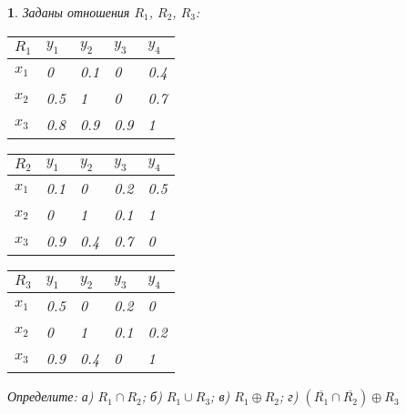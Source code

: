 \documentclass[11pt,a4paper,oneside]{article}
\newenvironment{problem}{
	\medskip
	\begin{problem-internal}
	}{
	\end{problem-internal}
}
\newtheorem{problem-internal}{}
\begin{document}
	\begin{problem}
		Заданы отношения $R_1$, $R_2$, $R_3$: 
		\begin{table}[!hbtp]
			\begin{tabular}{|l|l|l|l|l|}
				\hline
				$R_1$ & $y_1$ & $y_2$ & $y_3$ & $y_4$ \\ \hline
				$x_1$ & 0     & 0.1   & 0     & 0.4   \\ \hline
				$x_2$ & 0.5   & 1     & 0     & 0.7   \\ \hline
				$x_3$ & 0.8   & 0.9   & 0.9   & 1     \\ \hline
			\end{tabular}
		\end{table}
		\begin{table}[!hbtp]
			\begin{tabular}{|l|l|l|l|l|}
				\hline
				$R_2$ & $y_1$ & $y_2$ & $y_3$ & $y_4$ \\ \hline
				$x_1$ & 0.1     & 0   & 0.2     & 0.5   \\ \hline
				$x_2$ & 0   & 1     & 0.1     & 1   \\ \hline
				$x_3$ & 0.9   & 0.4   & 0.7   & 0     \\ \hline
			\end{tabular}
		\end{table}
		\begin{table}[!hbtp]
			\begin{tabular}{|l|l|l|l|l|}
				\hline
				$R_3$ & $y_1$ & $y_2$ & $y_3$ & $y_4$ \\ \hline
				$x_1$ & 0.5     & 0   & 0.2     & 0   \\ \hline
				$x_2$ & 0   & 1     & 0.1     & 0.2   \\ \hline
				$x_3$ & 0.9   & 0.4   & 0   & 1     \\ \hline
			\end{tabular}
		\end{table}
		\newline
		Определите: а) $R_1 \cap R_2$; б) $R_1 \cup R_3$; в) $ R_1 \oplus R_2 $; г) $ (\overline{R_1} \cap \overline{R_2}) \oplus R_3 $
	\end{problem}
	
\end{document}
